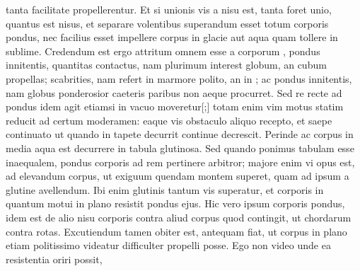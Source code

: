 \noindent tanta facilitate propellerentur. Et si unionis vis\protect{} a nisu est, tanta foret unio, quantus est nisus, et separare volentibus superandum esset totum corporis pondus\protect{}, nec facilius esset impellere corpus in glacie aut aqua quam tollere in sublime. Credendum est ergo attritum\protect{} omnem esse a corporum , pondus\protect{} innitentis, quantitas contactus, nam plurimum interest globum, an cubum propellas; scabrities, nam refert in marmore polito, an in  ; ac pondus\protect{} innitentis, nam globus ponderosior caeteris paribus non aeque procurret. Sed re recte  ad  pondus\protect{} idem agit etiamsi in vacuo moveretur[;] totam enim vim\protect{} motus statim reducit ad certum moderamen: eaque vis\protect{} obstaculo aliquo recepto, et saepe continuato ut quando in tapete decurrit continue decrescit. Perinde ac  corpus in media aqua  est  decurrere in tabula glutinosa. Sed quando ponimus tabulam esse inaequalem, pondus\protect{} corporis ad rem pertinere arbitror; majore enim vi\protect{} opus est, ad elevandum corpus, ut exiguum quendam montem superet, quam ad ipsum a glutine avellendum. Ibi enim glutinis tantum vis\protect{} superatur, et corporis in quantum motui in plano resistit pondus\protect{} ejus. Hic vero ipsum corporis pondus\protect{}, idem est de alio nisu corporis contra aliud corpus quod contingit, ut chordarum contra rotas. Excutiendum tamen obiter est, antequam  fiat, ut corpus in plano etiam politissimo videatur difficulter propelli posse. Ego non video unde ea resistentia\protect{} oriri possit, 